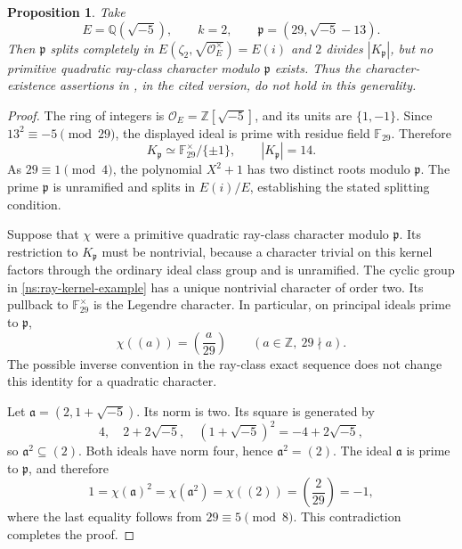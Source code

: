 \documentclass[11pt,reqno]{amsart}
\numberwithin{equation}{section}
\newtheorem{proposition}[theorem]{Proposition}
\theoremstyle{definition}
\theoremstyle{remark}
\newcommand{\Q}{\mathbb Q}
\begin{document}
\begin{proposition}\label{ns:ray-counterexample}
Take
\[
E=\Q(\sqrt{-5}),\qquad k=2,\qquad
\mathfrak p=(29,\sqrt{-5}-13).
\]
Then $\mathfrak p$ splits completely in
$E(\zeta_2,\sqrt{\mathcal O_E^\times})=E(i)$ and $2$ divides $|K_{\mathfrak p}|$, but no primitive quadratic ray-class character modulo $\mathfrak p$ exists. Thus the character-existence assertions in \cite[Lemma~4.1 and Proposition~4.3]{Jiang}, in the cited version, do not hold in this generality.
\end{proposition}
\begin{proof}
The ring of integers is $\mathcal O_E=\mathbb Z[\sqrt{-5}]$, and its units are $\{1,-1\}$. Since $13^2\equiv-5\pmod{29}$, the displayed ideal is prime with residue field $\mathbb F_{29}$. Therefore
\begin{equation}\label{ns:ray-kernel-example}
K_{\mathfrak p}\simeq\mathbb F_{29}^{\times}/\{\pm1\},
\qquad |K_{\mathfrak p}|=14.
\end{equation}
As $29\equiv1\pmod4$, the polynomial $X^2+1$ has two distinct roots modulo $\mathfrak p$. The prime $\mathfrak p$ is unramified and splits in $E(i)/E$, establishing the stated splitting condition.

Suppose that $\chi$ were a primitive quadratic ray-class character modulo $\mathfrak p$. Its restriction to $K_{\mathfrak p}$ must be nontrivial, because a character trivial on this kernel factors through the ordinary ideal class group and is unramified. The cyclic group in \eqref{ns:ray-kernel-example} has a unique nontrivial character of order two. Its pullback to $\mathbb F_{29}^{\times}$ is the Legendre character. In particular, on principal ideals prime to $\mathfrak p$,
\begin{equation}\label{ns:principal-character}
\chi((a))=\left(\frac{a}{29}\right)
\qquad(a\in\mathbb Z,\ 29\nmid a).
\end{equation}
The possible inverse convention in the ray-class exact sequence does not change this identity for a quadratic character.

Let $\mathfrak a=(2,1+\sqrt{-5})$. Its norm is two. Its square is generated by
\[
4,\quad 2+2\sqrt{-5},\quad (1+\sqrt{-5})^2=-4+2\sqrt{-5},
\]
so $\mathfrak a^2\subseteq(2)$. Both ideals have norm four, hence $\mathfrak a^2=(2)$. The ideal $\mathfrak a$ is prime to $\mathfrak p$, and therefore
\[
1=\chi(\mathfrak a)^2=\chi(\mathfrak a^2)=\chi((2))
=\left(\frac2{29}\right)=-1,
\]
where the last equality follows from $29\equiv5\pmod8$. This contradiction completes the proof.
\end{proof}
\end{document}
